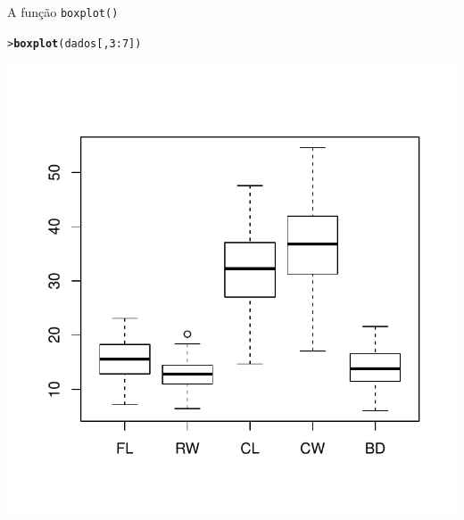 \documentclass[10pt]{beamer}\usepackage[]{graphicx}\usepackage[]{color}
\makeatletter
\newcommand{\hlnum}[1]{\textcolor[rgb]{0.686,0.059,0.569}{#1}}%
\newcommand{\hlopt}[1]{\textcolor[rgb]{0,0,0}{#1}}%
\newcommand{\hlstd}[1]{\textcolor[rgb]{0.345,0.345,0.345}{#1}}%
\newcommand{\hlkwd}[1]{\textcolor[rgb]{0.282,0.239,0.545}{\textbf{#1}}}%
\newenvironment{kframe}{%
 \def\at@end@of@kframe{}%
 \ifinner\ifhmode%
  \def\at@end@of@kframe{\end{minipage}}%
  \begin{minipage}{\columnwidth}%
 \fi\fi%
 \def\FrameCommand##1{\hskip\@totalleftmargin \hskip-\fboxsep
 \colorbox{shadecolor}{##1}\hskip-\fboxsep
     \hskip-\linewidth \hskip-\@totalleftmargin \hskip\columnwidth}%
 \MakeFramed {\advance\hsize-\width
   \@totalleftmargin\z@ \linewidth\hsize
   \@setminipage}}%
 {\par\unskip\endMakeFramed%
 \at@end@of@kframe}
\newenvironment{knitrout}{}{} %
\makeatother
\begin{document}

\begin{frame}[fragile=singleslide]{A função \texttt{boxplot()}}
\begin{knitrout}\small
{}\color{fgcolor}\begin{kframe}
\begin{alltt}
\hlstd{> }\hlkwd{boxplot}\hlstd{(dados[,} \hlnum{3}\hlopt{:}\hlnum{7}\hlstd{])}
\end{alltt}
\end{kframe}

{\centering \includegraphics[width=.7\textwidth]{figure/unnamed-chunk-29} 

}



\end{knitrout}

\end{frame}
\end{document}
